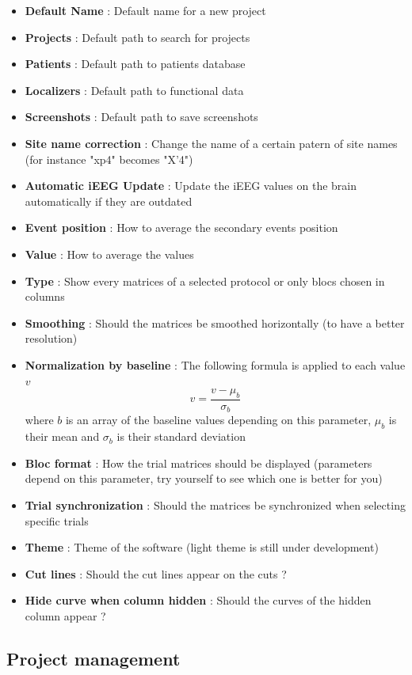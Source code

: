 \documentclass[a4paper]{article}
\begin{document}
\begin{itemize}
\item \textbf{Default Name} : Default name for a new project
\item \textbf{Projects} : Default path to search for projects
\item \textbf{Patients} : Default path to patients database
\item \textbf{Localizers} : Default path to functional data
\item \textbf{Screenshots} : Default path to save screenshots
\item \textbf{Site name correction} : Change the name of a certain patern of site names (for instance "xp4" becomes "X'4")
\item \textbf{Automatic iEEG Update} : Update the iEEG values on the brain automatically if they are outdated
\item \textbf{Event position} : How to average the secondary events position
\item \textbf{Value} : How to average the values
\item \textbf{Type} : Show every matrices of a selected protocol or only blocs chosen in columns
\item \textbf{Smoothing} : Should the matrices be smoothed horizontally (to have a better resolution)
\item \textbf{Normalization by baseline} : The following formula is applied to each value $v$ $$v = \frac{v - \mu_{b}}{\sigma_{b}}$$ where $b$ is an array of the baseline values depending on this parameter, $\mu_b$ is their mean and $\sigma_b$ is their standard deviation
\item \textbf{Bloc format} : How the trial matrices should be displayed (parameters depend on this parameter, try yourself to see which one is better for you)
\item \textbf{Trial synchronization} : Should the matrices be synchronized when selecting specific trials
\item \textbf{Theme} : Theme of the software (light theme is still under development)
\item \textbf{Cut lines} : Should the cut lines appear on the cuts ?
\item \textbf{Hide curve when column hidden} : Should the curves of the hidden column appear ?
\end{itemize}
\subsection{Project management}
\end{document}
